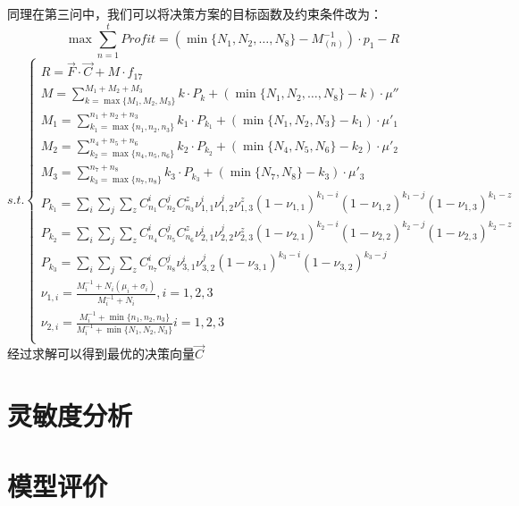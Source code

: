 \documentclass[withoutpreface,bwprint]{cumcmthesis} %
\begin{document}
同理在第三问中，我们可以将决策方案的目标函数及约束条件改为：
$$\max	\sum_{n=1}^{t}\textit{Profit}=(\min \{N_{1},N_{2},\dots,N_{8}\}-M_{(n)}^{-1})\cdot p_{1}-R$$
\begin{equation*}
s.t.\begin{cases}
	 R=\vec{F}\cdot \vec{C} + M\cdot f_{17}\\
	 M=\sum_{k=\max \{M_{1},M_{2},M_{3}\}}^{M_{1}+M_{2}+M_{3}}k\cdot P_{k}+(\min \{N_{1},N_{2},\dots,N_{8}\}-k)\cdot \mu''\\
	 M_{1}=\sum_{k_{1}=\max \{n_{1},n_{2},n_{3}\}}^{n_{1}+n_{2}+n_{3}}k_{1}\cdot P_{k_{1}}+(\min \{N_{1},N_{2},N_{3}\}-k_{1})\cdot \mu'_{1}\\
	 M_{2}=\sum_{k_{2}=\max \{n_{4},n_{5},n_{6}\}}^{n_{4}+n_{5}+n_{6}}k_{2}\cdot P_{k_{2}}+(\min \{N_{4},N_{5},N_{6}\}-k_{2})\cdot \mu'_{2}\\
	 M_{3}=\sum_{k_{3}=\max \{n_{7},n_{8}\}}^{n_{7}+n_{8}}k_{3}\cdot P_{k_{3}}+(\min \{N_{7},N_{8}\}-k_{3})\cdot \mu'_{3}\\
	 P_{k_{1}}=\sum_{i}\sum_{j}\sum_{z}C_{n_{1}}^{i}C_{n_{2}}^{j}C_{n_{3}}^{z}\nu_{1,1}^{i}\nu_{1,2}^{j}\nu_{1,3}^{z}(1-\nu_{1,1})^{k_{1}-i}(1-\nu_{1,2})^{k_{1}-j}(1-\nu_{
	 1,3})^{k_{1}-z}\\
	 P_{k_{2}}=\sum_{i}\sum_{j}\sum_{z}C_{n_{4}}^{i}C_{n_{5}}^{j}C_{n_{6}}^{z}\nu_{2,1}^{i}\nu_{2,2}^{j}\nu_{2,3}^{z}(1-\nu_{2,1})^{k_{2}-i}(1-\nu_{2,2})^{k_{2}-j}(1-\nu_{
	 2,3})^{k_{2}-z}\\
	 P_{k_{3}}=\sum_{i}\sum_{j}\sum_{z}C_{n_{7}}^{i}C_{n_{8}}^{j}\nu_{3,1}^{i}\nu_{3,2}^{j}(1-\nu_{3,1})^{k_{3}-i}(1-\nu_{3,2})^{k_{3}-j}\\
	 \nu_{1,i}=\frac{M_{i}^{-1}+N_{i}(\mu_{i}+\sigma_{i})}{M_{i}^{-1}+N_{i}} ,i=1,2,3\\
	\nu_{2,i}=\frac{M_{i}^{-1}+\min \{ n_{1},n_{2},n_{3}\}}{M_{i}^{-1}+\min \{N_{1},N_{2},N_{3}\}} i=1,2,3\\
	\end{cases}
\end{equation*}
经过求解可以得到最优的决策向量$\vec{C}$
\section{灵敏度分析}
\section{模型评价}

\begin{thebibliography}{9}%
    
    \bibitem[2]{}

    \bibitem[3]{}
    
    \bibitem[4]{}
   
    \bibitem[5]{}
   
    \bibitem[6]{}
   
    \bibitem[7]{}
   
    \bibitem[8]{}
   
\end{thebibliography}
\end{document}
